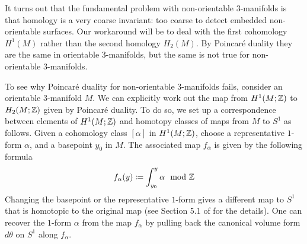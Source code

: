 It turns out that the fundamental problem with non-orientable $3$-manifolds is that homology is a
very coarse invariant: too coarse to detect embedded non-orientable surfaces. Our workaround will
be to deal with the first cohomology $H^1(M)$ rather than the second homology $H_2(M)$. By Poincar\'e duality they are the same in orientable 3-manifolds, but the same is not true for non-orientable $3$-manifolds.

To see why Poincar\'e duality for non-orientable 3-manifolds fails, consider an orientable $3$-manifold $M$. We can explicitly work out the map from
$H^1(M; \mathbb{Z})$ to $H_2(M; \mathbb{Z})$ given by Poincar\'e duality.
To do so, we set up a correspondence between elements of $H^1(M; \mathbb{Z})$ and homotopy classes of maps from
$M$ to $S^1$ as follows. Given a cohomology class $[\alpha]$ in $H^1(M; \mathbb{Z})$, choose a representative $1$-form $\alpha$,
and a basepoint $y_0$ in $M$. The associated map $f_{\alpha}$ is given by the following formula
\begin{align}\label{form:map}
  f_{\alpha}(y) \coloneqq  \int_{y_0}^y \alpha \mod {\mathbb{Z}}
\end{align}
Changing the basepoint or the representative $1$-form gives a different map to $S^1$ that is homotopic to the
original map (see Section 5.1 of \cite{calegari2007foliations} for the details). One can recover the $1$-form
$\alpha$ from the map $f_{\alpha}$ by pulling back the canonical volume form $d\theta$ on $S^1$ along $f_{\alpha}$.

